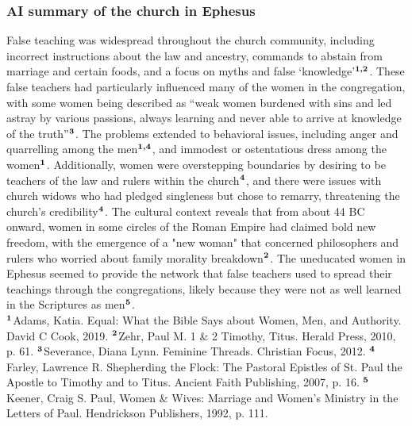 \documentclass[10pt,a4paper,final, twocolumn]{article}
\renewcommand{\textsuperscript}[1]{\ensuremath{^{\textbf{\scriptsize #1}}}}
\begin{document}
\subsubsection*{AI summary of the church in Ephesus}
False teaching was widespread throughout the church community, including incorrect instructions about the law and ancestry, commands to abstain from marriage and certain foods, and a focus on myths and false `knowledge'\textsuperscript{1,2}. These false teachers had particularly influenced many of the women in the congregation, with some women being described as ``weak women burdened with sins and led astray by various passions, always learning and never able to arrive at knowledge of the truth''\textsuperscript{3}. The problems extended to behavioral issues, including anger and quarrelling among the men\textsuperscript{1,4}, and immodest or ostentatious dress among the women\textsuperscript{1}. Additionally, women were overstepping boundaries by desiring to be teachers of the law and rulers within the church\textsuperscript{4}, and there were issues with church widows who had pledged singleness but chose to remarry, threatening the church's credibility\textsuperscript{4}. The cultural context reveals that from about 44 BC onward, women in some circles of the Roman Empire had claimed bold new freedom, with the emergence of a "new woman" that concerned philosophers and rulers who worried about family morality breakdown\textsuperscript{2}. The uneducated women in Ephesus seemed to provide the network that false teachers used to spread their teachings through the congregations, likely because they were not as well learned in the Scriptures as men\textsuperscript{5}.\\
\textsuperscript{1}Adams, Katia. Equal: What the Bible Says about Women, Men, and Authority. David C Cook, 2019.
\textsuperscript{2}Zehr, Paul M. 1 \& 2 Timothy, Titus. Herald Press, 2010, p. 61.
\textsuperscript{3}Severance, Diana Lynn. Feminine Threads. Christian Focus, 2012.
\textsuperscript{4}Farley, Lawrence R. Shepherding the Flock: The Pastoral Epistles of St. Paul the Apostle to Timothy and to Titus. Ancient Faith Publishing, 2007, p. 16.
\textsuperscript{5}Keener, Craig S. Paul, Women \& Wives: Marriage and Women’s Ministry in the Letters of Paul. Hendrickson Publishers, 1992, p. 111.
\end{document}
